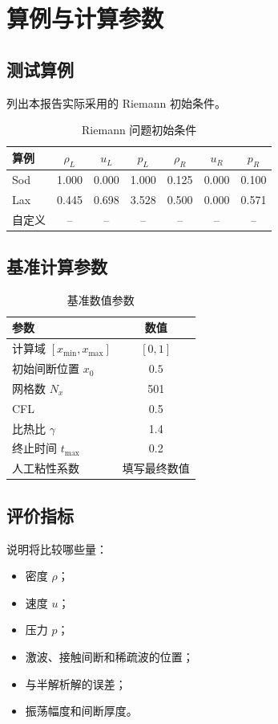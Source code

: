 \section{算例与计算参数}

\subsection{测试算例}

列出本报告实际采用的 Riemann 初始条件。

\begin{table}[H]
    \centering
    \caption{Riemann 问题初始条件}
    \label{tab:cases}
    \begin{tabular}{lcccccc}
        \toprule
        算例 & $\rho_L$ & $u_L$ & $p_L$ & $\rho_R$ & $u_R$ & $p_R$\\
        \midrule
        Sod & 1.000 & 0.000 & 1.000 & 0.125 & 0.000 & 0.100\\
        Lax & 0.445 & 0.698 & 3.528 & 0.500 & 0.000 & 0.571\\
        自定义 & -- & -- & -- & -- & -- & --\\
        \bottomrule
    \end{tabular}
\end{table}

\subsection{基准计算参数}

\begin{table}[H]
    \centering
    \caption{基准数值参数}
    \label{tab:parameters}
    \begin{tabular}{lc}
        \toprule
        参数 & 数值\\
        \midrule
        计算域 $[x_{\min},x_{\max}]$ & $[0,1]$\\
        初始间断位置 $x_0$ & $0.5$\\
        网格数 $N_x$ & 501\\
        CFL & 0.5\\
        比热比 $\gamma$ & 1.4\\
        终止时间 $t_{\max}$ & 0.2\\
        人工粘性系数 & 填写最终数值\\
        \bottomrule
    \end{tabular}
\end{table}

\subsection{评价指标}

说明将比较哪些量：

\begin{itemize}[leftmargin=2em]
    \item 密度 $\rho$；
    \item 速度 $u$；
    \item 压力 $p$；
    \item 激波、接触间断和稀疏波的位置；
    \item 与半解析解的误差；
    \item 振荡幅度和间断厚度。
\end{itemize}

